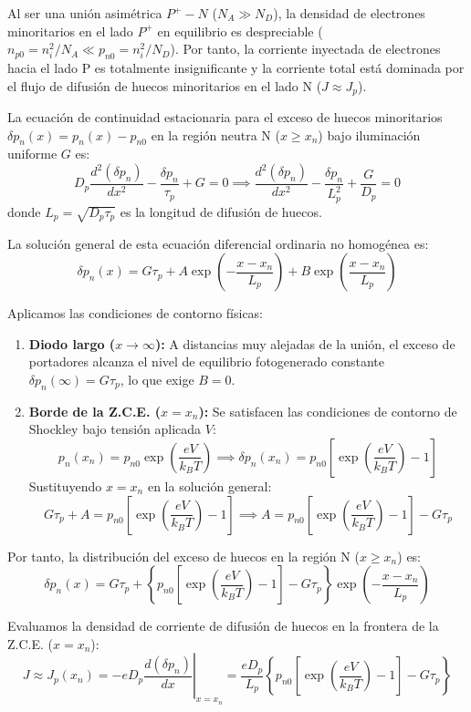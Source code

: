 \begin{problema}
Al ser una unión asimétrica $P^+-N$ ($N_A \gg N_D$), la densidad de electrones minoritarios en el lado $P^+$ en equilibrio es despreciable ($n_{p0} = n_i^2 / N_A \ll p_{n0} = n_i^2 / N_D$). Por tanto, la corriente inyectada de electrones hacia el lado P es totalmente insignificante y la corriente total está dominada por el flujo de difusión de huecos minoritarios en el lado N ($J \approx J_p$).

La ecuación de continuidad estacionaria para el exceso de huecos minoritarios $\delta p_n(x) = p_n(x) - p_{n0}$ en la región neutra N ($x \ge x_n$) bajo iluminación uniforme $G$ es:
\[
D_p \frac{d^2(\delta p_n)}{dx^2} - \frac{\delta p_n}{\tau_p} + G = 0 \implies \frac{d^2(\delta p_n)}{dx^2} - \frac{\delta p_n}{L_p^2} + \frac{G}{D_p} = 0
\]
donde $L_p = \sqrt{D_p \tau_p}$ es la longitud de difusión de huecos.

La solución general de esta ecuación diferencial ordinaria no homogénea es:
\[
\delta p_n(x) = G \tau_p + A \exp\left(-\frac{x - x_n}{L_p}\right) + B \exp\left(\frac{x - x_n}{L_p}\right)
\]

Aplicamos las condiciones de contorno físicas:
\begin{enumerate}
    \item \textbf{Diodo largo ($x \to \infty$):} A distancias muy alejadas de la unión, el exceso de portadores alcanza el nivel de equilibrio fotogenerado constante $\delta p_n(\infty) = G \tau_p$, lo que exige $B = 0$.
    \item \textbf{Borde de la Z.C.E. ($x = x_n$):} Se satisfacen las condiciones de contorno de Shockley bajo tensión aplicada $V$:
    \[
    p_n(x_n) = p_{n0} \exp\left(\frac{e V}{k_B T}\right) \implies \delta p_n(x_n) = p_{n0} \left[ \exp\left(\frac{e V}{k_B T}\right) - 1 \right]
    \]
    Sustituyendo $x = x_n$ en la solución general:
    \[
    G \tau_p + A = p_{n0} \left[ \exp\left(\frac{e V}{k_B T}\right) - 1 \right] \implies A = p_{n0} \left[ \exp\left(\frac{e V}{k_B T}\right) - 1 \right] - G \tau_p
    \]
\end{enumerate}

Por tanto, la distribución del exceso de huecos en la región N ($x \ge x_n$) es:
\[
\delta p_n(x) = G \tau_p + \left\{ p_{n0} \left[ \exp\left(\frac{e V}{k_B T}\right) - 1 \right] - G \tau_p \right\} \exp\left(-\frac{x - x_n}{L_p}\right)
\]

Evaluamos la densidad de corriente de difusión de huecos en la frontera de la Z.C.E. ($x = x_n$):
\[
J \approx J_p(x_n) = -e D_p \left. \frac{d(\delta p_n)}{dx} \right|_{x=x_n} = \frac{e D_p}{L_p} \left\{ p_{n0} \left[ \exp\left(\frac{e V}{k_B T}\right) - 1 \right] - G \tau_p \right\}
\]


\end{problema}
